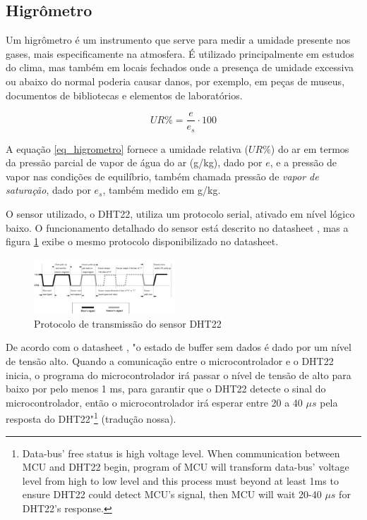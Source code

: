 \documentclass[twocolumn,11pt]{article}
\begin{document}
{\subsection{Higrômetro}\label{desenvolvimento_higrometro}
Um higrômetro é um instrumento que serve para medir a umidade presente nos gases, mais especificamente na atmosfera. É utilizado principalmente em estudos do clima, mas também em locais fechados onde a presença de umidade excessiva ou abaixo do normal poderia causar danos, por exemplo, em peças de museus, documentos de bibliotecas e elementos de laboratórios.\par

\begin{equation}
  UR\% = \frac{e}{e_s} \cdot 100
  \label{eq_higrometro}
\end{equation}

A equação \ref{eq_higrometro} fornece a umidade relativa ($UR\%$) do ar em termos da pressão parcial de vapor de água do ar (g/kg), dado por $e$, e a pressão de vapor nas condições de equilíbrio, também chamada pressão de \textit{vapor de saturação}, dado por $e_s$, também medido em g/kg.\par

O sensor utilizado, o DHT22, utiliza um protocolo serial, ativado em nível lógico baixo. O funcionamento detalhado do sensor está descrito no datasheet \cite{dht22ds}, mas a figura \ref{protocolo_dht22} exibe o mesmo protocolo disponibilizado no datasheet.\par

\begin{figure}
  \includegraphics[width=200px]{sensor_umidade.png}
  \caption{Protocolo de transmissão do sensor DHT22}
  \label{protocolo_dht22}
\end{figure}

De acordo com o datasheet \cite{dht22ds}, "o estado de buffer sem dados é dado por um nível de tensão alto. Quando a comunicação entre o microcontrolador e o DHT22 inicia, o programa do microcontrolador irá passar o nível de tensão de alto para baixo por pelo menos 1 ms, para garantir que o DHT22 detecte o sinal do microcontrolador, então o microcontrolador irá esperar entre 20 a 40 $\mu s$ pela resposta do DHT22"\footnote{Data-bus' free status is high voltage level. When communication between MCU and DHT22 begin, program of MCU will transform data-bus' voltage level from high to low level and this process must beyond at least 1ms to ensure DHT22 could detect MCU's signal, then MCU will wait 20-40 $\mu s$ for DHT22's response.} (tradução nossa).

}
\end{document}
